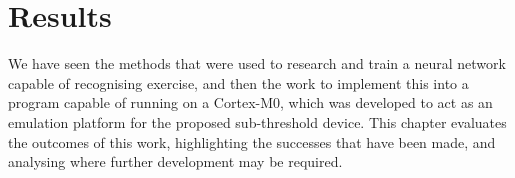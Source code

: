 \chapter{Results}\label{chap:results}

We have seen the methods that were used to research and train a neural network capable of recognising exercise, and then the work to implement this into a program capable of running on a Cortex-M0, which was developed to act as an emulation platform for the proposed sub-threshold device. This chapter evaluates the outcomes of this work, highlighting the successes that have been made, and analysing where further development may be required.





